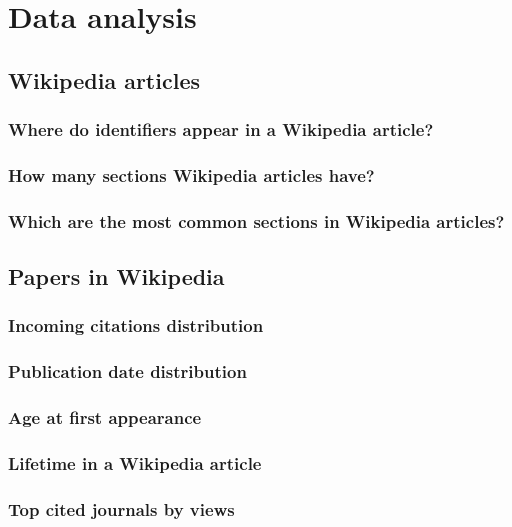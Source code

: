 
\chapter{Data analysis}
\label{cha:data_analysis}

\section{Wikipedia articles}
\subsection{Where do identifiers appear in a Wikipedia article?}

\subsection{How many sections Wikipedia articles have?}

\subsection{Which are the most common sections in Wikipedia articles?}

\section{Papers in Wikipedia}

\subsection{Incoming citations distribution}

\subsection{Publication date distribution}

\subsection{Age at first appearance}

\subsection{Lifetime in a Wikipedia article}

\subsection{Top cited journals by views}
